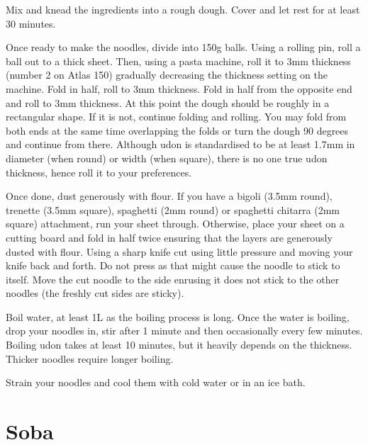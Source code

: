 Mix and knead the ingredients into a rough dough. Cover and let rest for at
least 30 minutes.

Once ready to make the noodles, divide into 150g balls. Using a rolling pin,
roll a ball out to a thick sheet. Then, using a pasta machine, roll it to 3mm
thickness (number 2 on Atlas 150) gradually decreasing the thickness setting on
the machine. Fold in half, roll to 3mm thickness. Fold in half from the
opposite end and roll to 3mm thickness. At this point the dough should be
roughly in a rectangular shape. If it is not, continue folding and rolling. You
may fold from both ends at the same time overlapping the folds or turn the
dough 90 degrees and continue from there. Although udon is standardised to be
at least 1.7mm in diameter (when round) or width (when square), there is no one
true udon thickness, hence roll it to your preferences.

Once done, dust generously with flour. If you have a bigoli (3.5mm round),
trenette (3.5mm square), spaghetti (2mm round) or spaghetti chitarra (2mm
square) attachment, run your sheet through. Otherwise, place your sheet on a
cutting board and fold in half twice ensuring that the layers are generously
dusted with flour. Using a sharp knife cut using little pressure and moving
your knife back and forth. Do not press as that might cause the noodle to stick
to itself. Move the cut noodle to the side enrusing it does not stick to the
other noodles (the freshly cut sides are sticky).

Boil water, at least 1L as the boiling process is long. Once the water is
boiling, drop your noodles in, stir after 1 minute and then occasionally every
few minutes. Boiling udon takes at least 10 minutes, but it heavily depends on
the thickness. Thicker noodles require longer boiling.

Strain your noodles and cool them with cold water or in an ice bath.

\section{Soba}
